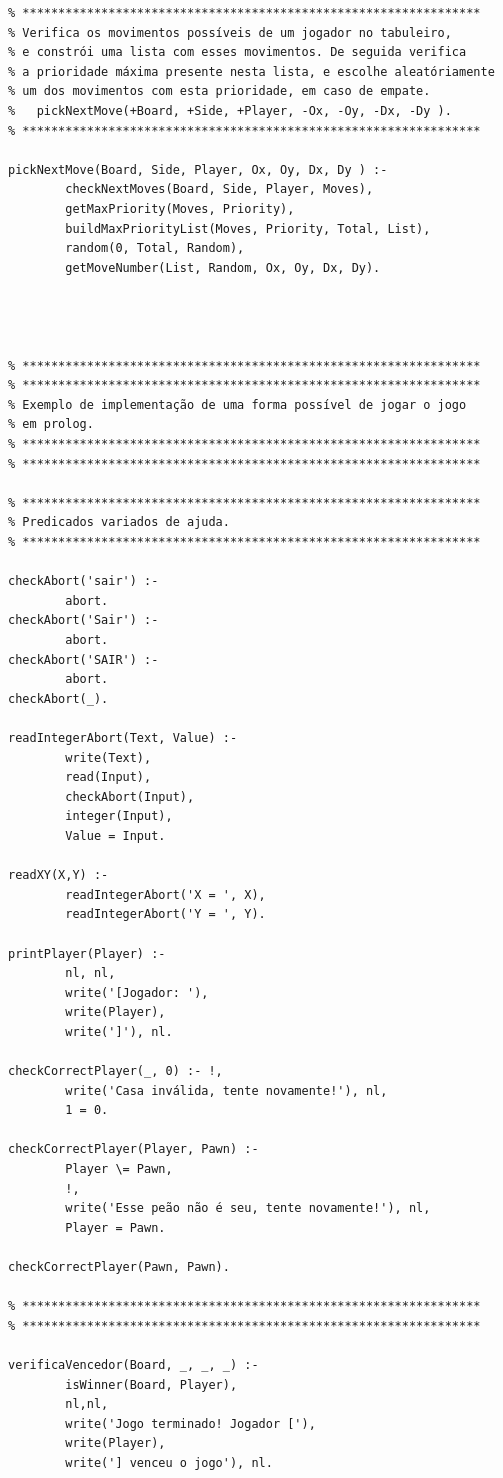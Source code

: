 \documentclass[15pt,a4paper]{article}
\begin{document}
\begin{lstlisting}
% ****************************************************************
% Verifica os movimentos possíveis de um jogador no tabuleiro,
% e constrói uma lista com esses movimentos. De seguida verifica
% a prioridade máxima presente nesta lista, e escolhe aleatóriamente
% um dos movimentos com esta prioridade, em caso de empate.
%	pickNextMove(+Board, +Side, +Player, -Ox, -Oy, -Dx, -Dy ).
% ****************************************************************

pickNextMove(Board, Side, Player, Ox, Oy, Dx, Dy ) :-
		checkNextMoves(Board, Side, Player, Moves),
		getMaxPriority(Moves, Priority),
		buildMaxPriorityList(Moves, Priority, Total, List),
		random(0, Total, Random),
		getMoveNumber(List, Random, Ox, Oy, Dx, Dy).
		
		
		
		
% ****************************************************************
% ****************************************************************
% Exemplo de implementação de uma forma possível de jogar o jogo
% em prolog.
% ****************************************************************
% ****************************************************************

% ****************************************************************
% Predicados variados de ajuda.
% ****************************************************************

checkAbort('sair') :-
		abort.
checkAbort('Sair') :-
		abort.
checkAbort('SAIR') :-
		abort.
checkAbort(_).

readIntegerAbort(Text, Value) :-
		write(Text),
		read(Input),
		checkAbort(Input),
		integer(Input),
		Value = Input.
		
readXY(X,Y) :-
		readIntegerAbort('X = ', X),
		readIntegerAbort('Y = ', Y).
		
printPlayer(Player) :-
		nl, nl,
		write('[Jogador: '),
		write(Player),
		write(']'), nl.

checkCorrectPlayer(_, 0) :- !,
		write('Casa inválida, tente novamente!'), nl,
		1 = 0.
		
checkCorrectPlayer(Player, Pawn) :-
		Player \= Pawn,
		!,
		write('Esse peão não é seu, tente novamente!'), nl,
		Player = Pawn.
		
checkCorrectPlayer(Pawn, Pawn).

% ****************************************************************
% ****************************************************************

verificaVencedor(Board, _, _, _) :-
		isWinner(Board, Player),
		nl,nl,
		write('Jogo terminado! Jogador ['),
		write(Player),
		write('] venceu o jogo'), nl.
	

\end{lstlisting}
\end{document}
